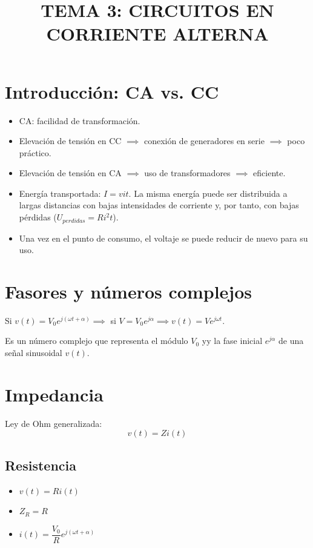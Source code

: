 \documentclass[10pt,a4paper]{article}
\begin{document}
	\title{TEMA 3: CIRCUITOS EN CORRIENTE ALTERNA}
	\date{}
	\author{}
	\maketitle
	
	\section{Introducción: CA vs. CC}
	
	\begin{itemize}
		\item CA: facilidad de transformación.
		\item Elevación de tensión en CC $\implies$ conexión de generadores en serie $\implies$ poco práctico.
		\item Elevación de tensión en CA $\implies$ uso de transformadores $\implies$ eficiente.
		\item Energía transportada: $I = vit$. La misma energía puede ser distribuida a largas distancias con bajas intensidades de corriente y, por tanto, con bajas pérdidas ($U_{perdidas} = Ri^2t$).
		\item Una vez en el punto de consumo, el voltaje se puede reducir de nuevo para su uso.
	\end{itemize}
	
	\section{Fasores y números complejos}
	
	Si $v(t) = V_0 e^{j (\omega t + \alpha)} \implies$ si $V = V_0 e^{j \alpha} \implies v(t) = V e ^{j \omega t}$. \newline
	
	Es un número complejo que representa el módulo $V_0$ yy la fase inicial $e ^{j \alpha}$ de una señal sinusoidal $v(t)$.
	
	\section{Impedancia}
	
	Ley de Ohm generalizada:
	$$\boxed{v(t) = Z i(t)}$$
	
	\subsection{Resistencia}
	
	\begin{itemize}
		\item $v(t) = R i(t)$
		\item $Z_R = R$
		\item $i(t) = \dfrac{V_0}{R}e^{j(\omega t + \alpha)}$
	\end{itemize}
	
\end{document}
